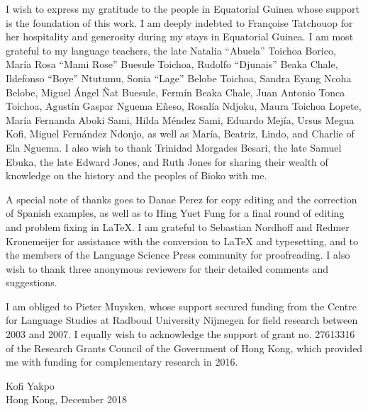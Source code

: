 
I wish to express my gratitude to the people in Equatorial Guinea whose support is the foundation of this work. I am deeply indebted to Françoise Tatchouop for her hospitality and generosity during my stays in Equatorial Guinea. I am most grateful to my language teachers, the late Natalia “Abuela” Toichoa Borico, María Rosa “Mami Rose” Buesule Toichoa, Rudolfo “Djunais” Beaka Chale, Ildefonso “Boye” Ntutumu, Sonia “Lage” Belobe Toichoa, Sandra Eyang Ncoha Belobe, Miguel Ángel Ñat Buesule, Fermín Beaka Chale, Juan Antonio Tonca Toichoa, Agustín Gaspar Nguema Eñeso, Rosalía Ndjoku, Maura Toichoa Lopete, María Fernanda Aboki Sami, Hilda Méndez Sami, Eduardo Mejía, Ursus Megua Kofi, Miguel Fernández Ndonjo, as well as María, Beatriz, Lindo, and Charlie of Ela Nguema. I also wish to thank Trinidad Morgades Besari, the late Samuel Ebuka, the late Edward Jones, and Ruth Jones for sharing their wealth of knowledge on the history and the peoples of Bioko with me.


A special note of thanks goes to Danae Perez for copy editing and the correction of Spanish examples, as well as to Hing Yuet Fung for a final round of editing and problem fixing in LaTeX. I am grateful to Sebastian Nordhoff and Redmer Kronemeijer for assistance with the conversion to LaTeX and typesetting, and to the members of the Language Science Press community for proofreading. I also wish to thank three anonymous reviewers for their detailed comments and suggestions.


I am obliged to Pieter Muysken, whose support secured funding from the Centre for Language Studies at Radboud University Nijmegen for field research between 2003 and 2007. I equally wish to acknowledge the support of grant no. 27613316 of the Research Grants Council of the Government of Hong Kong, which provided me with funding for complementary research in 2016.

{\raggedleft
Kofi Yakpo\\
Hong Kong, {December 2018} \par
}

